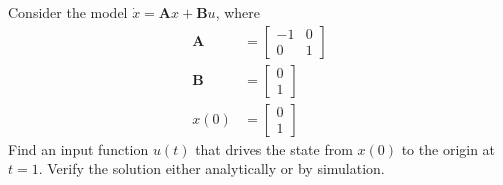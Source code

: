 \documentclass[]{article}
\begin{document}
Consider the model $\dot{x} = \mathbf{A}x + \mathbf{B}u$, where
\begin{align*}
	\mathbf{A} &= \begin{bmatrix}
	-1 & 0 \\
	0 & 1
	\end{bmatrix} \\
	\mathbf{B} &= \begin{bmatrix}
	0 \\
	1
	\end{bmatrix} \\
	x(0) &= \begin{bmatrix}
	0 \\
	1
	\end{bmatrix}
\end{align*}
Find an input function $u(t)$ that drives the state from $x(0)$ to the origin at $t=1$.
Verify the solution either analytically or by simulation.
\end{document}
